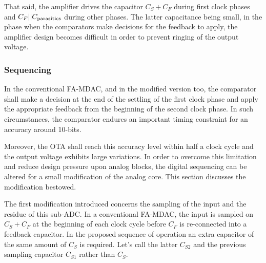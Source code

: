 That said, the amplifier drives the capacitor $C_S+C_F$ during first clock phases and $C_F||C_{\rm parasitics}$ during other phases. The latter capacitance being small, in the phase when the comparators make decisions for the feedback to apply, the amplifier design becomes difficult in order to prevent ringing of the output voltage. 

	\subsubsection{Sequencing}
In the conventional FA-MDAC, and in the modified version too, the comparator shall make a decision at the end of the settling of the first clock phase and apply the appropriate feedback from the beginning of the second clock phase. In such circumstances, the comparator endures an important timing constraint for an accuracy around 10-bits.

Moreover, the OTA shall reach this accuracy level within half a clock cycle and the output voltage exhibits large variations. In order to overcome this limitation and reduce design pressure upon analog blocks, the digital sequencing can be altered for a small modification of the analog core. This section discusses the modification bestowed.

The first modification introduced concerns the sampling of the input and the residue of this sub-ADC\@. In a conventional FA-MDAC, the input is sampled on \(C_S + C_F\) at the beginning of each clock cycle before \(C_F\) is re-connected into a feedback capacitor. In the proposed sequence of operation an extra capacitor of the same amount of \(C_S\) is required. Let's call the latter \(C_{S2}\) and the previous sampling capacitor \(C_{S1}\) rather than \(C_S\).

